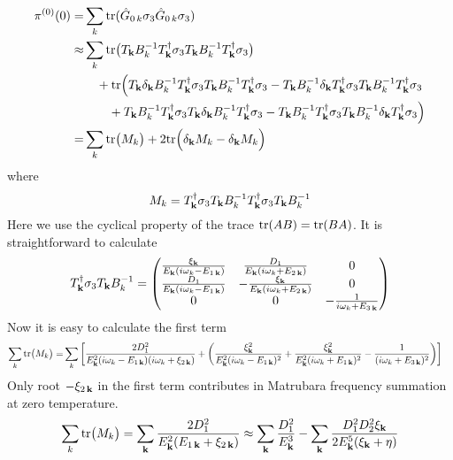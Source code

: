 \begin{equation}\label{eq:pathInt2:pi0}
\begin{split}
\pi^{(0)}(0)=&\sum_k\text{tr}(\hat{G}_{0\,k}\sigma_3\hat{G}_{0\,k}\sigma_3)\\
	\approx&\sum_k\text{tr}\big(T_{\mathbf{k}}B_{k}^{-1}T_{\mathbf{k}}^{\dagger}\sigma_3T_{\mathbf{k}}B_{k}^{-1}T_{\mathbf{k}}^{\dagger}\sigma_3\big)\\
	&\quad+\text{tr}\Big(T_{\mathbf{k}}\delta_{\mathbf{k}}B_{k}^{-1}T_{\mathbf{k}}^{\dagger}\sigma_3T_{\mathbf{k}}B_{k}^{-1}T_{\mathbf{k}}^{\dagger}\sigma_3
	-T_{\mathbf{k}}B_{k}^{-1}\delta_{\mathbf{k}}T_{\mathbf{k}}^{\dagger}\sigma_3T_{\mathbf{k}}B_{k}^{-1}T_{\mathbf{k}}^{\dagger}\sigma_3\\
	&\qquad+T_{\mathbf{k}}B_{k}^{-1}T_{\mathbf{k}}^{\dagger}\sigma_3T_{\mathbf{k}}\delta_{\mathbf{k}}B_{k}^{-1}T_{\mathbf{k}}^{\dagger}\sigma_3
	-T_{\mathbf{k}}B_{k}^{-1}T_{\mathbf{k}}^{\dagger}\sigma_3T_{\mathbf{k}}B_{k}^{-1}\delta_{\mathbf{k}}T_{\mathbf{k}}^{\dagger}\sigma_3\Big)\\
	=&\sum_k\text{tr}\big(M_{k}\big)+2\text{tr}\Big(\delta_{\mathbf{k}}M_{k}-\delta_{\mathbf{k}}M_{k}\Big)
\end{split}
\end{equation}
where 
\begin{equation}
M_{k}=T_{\mathbf{k}}^{\dagger}\sigma_3T_{\mathbf{k}}B_{k}^{-1}T_{\mathbf{k}}^{\dagger}\sigma_3T_{\mathbf{k}}B_{k}^{-1}
\end{equation}
Here we use the cyclical  property of the trace $\text{tr}(AB)=\text{tr}(BA)$.  
It is straightforward to calculate
\begin{equation*}
T_{\mathbf{k}}^{\dagger}\sigma_3T_{\mathbf{k}}B_{k}^{-1}=
\begin{pmatrix}
{\frac{\xi_{\ensuremath{\mathbf{k}}}}{E_{\ensuremath{\mathbf{k}}}(i\omega_{k}-E_{1\,\ensuremath{\mathbf{k}}})}}&\frac{D_{1}}{E_{\mathbf{k}}(i\omega_{k}+E_{2\,\mathbf{k}})}&0\\
{\frac{D_{1}}{E_{\mathbf{k}}(i\omega_{k}-E_{1\,\mathbf{k}})}}&-\frac{\xi_{\mathbf{k}}}{E_{\mathbf{k}}(i\omega_{k}+E_{2\,\mathbf{k}})}&0\\
0&0&-\frac{1}{i\omega_{k}+E_{3\,\mathbf{k}}}\\
\end{pmatrix}
\end{equation*}
Now it is easy to calculate the first term
\begin{equation}
\begin{split}
\sum_k\text{tr}\big(M_{k}\big)=&
\sum_{k}\left[
\frac{2D_{1}^{2}}{E_{\mathbf{k}}^{2}(i\omega_{k}-E_{1\,\mathbf{k}})(i\omega_{k}+\xi_{2\,\mathbf{k}})}+
\left(\frac{\xi_{\mathbf{k}}^{2}}{E_{\mathbf{k}}^{2}(i\omega_{k}-E_{1\,\mathbf{k}})^{2}}+\frac{\xi_{\mathbf{k}}^{2}}{E_{\mathbf{k}}^{2}(i\omega_{k}+E_{1\,\mathbf{k}})^{2}}
-\frac{1}{(i\omega_{k}+E_{3\,\mathbf{k}})^{2}}\right)
\right]
\end{split}
\end{equation}
Only root $-\xi_{2\,\mathbf{k}}$ in the first term contributes in Matrubara frequency summation at zero temperature.
\begin{equation}\label{eq:pathInt2:pi0-1}
\sum_k\text{tr}\big(M_{k}\big)=\sum_{\mathbf{k}}\frac{2D_{1}^{2}}{E_{\mathbf{k}}^{2}(E_{1\,\mathbf{k}}+\xi_{2\,\mathbf{k}})}
\approx\sum_{\mathbf{k}}\frac{D_{1}^{2}}{E_{\mathbf{k}}^{3}}-\sum_{\mathbf{k}}\frac{D_{1}^{2}D_{2}^{2}\xi_{\mathbf{k}}}{2E_{\mathbf{k}}^{5}(\xi_{\mathbf{k}}+\eta)}
\end{equation}

